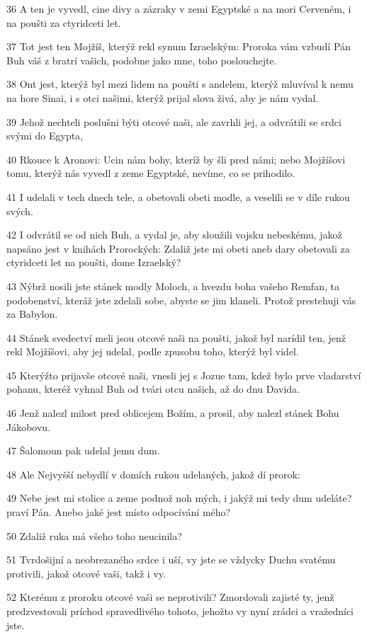 \par 36 A ten je vyvedl, cine divy a zázraky v zemi Egyptské a na mori Cerveném, i na poušti za ctyridceti let.
\par 37 Tot jest ten Mojžíš, kterýž rekl synum Izraelským: Proroka vám vzbudí Pán Buh váš z bratrí vašich, podobne jako mne, toho poslouchejte.
\par 38 Ont jest, kterýž byl mezi lidem na poušti s andelem, kterýž mluvíval k nemu na hore Sinai, i s otci našimi, kterýž prijal slova živá, aby je nám vydal.
\par 39 Jehož nechteli poslušni býti otcové naši, ale zavrhli jej, a odvrátili se srdci svými do Egypta,
\par 40 Rkouce k Aronovi: Ucin nám bohy, kteríž by šli pred námi; nebo Mojžíšovi tomu, kterýž nás vyvedl z zeme Egyptské, nevíme, co se prihodilo.
\par 41 I udelali v tech dnech tele, a obetovali obeti modle, a veselili se v díle rukou svých.
\par 42 I odvrátil se od nich Buh, a vydal je, aby sloužili vojsku nebeskému, jakož napsáno jest v knihách Prorockých: Zdaliž jste mi obeti aneb dary obetovali za ctyridceti let na poušti, dome Izraelský?
\par 43 Nýbrž nosili jste stánek modly Moloch, a hvezdu boha vašeho Remfan, ta podobenství, kteráž jste zdelali sobe, abyste se jim klaneli. Protož prestehuji vás za Babylon.
\par 44 Stánek svedectví meli jsou otcové naši na poušti, jakož byl narídil ten, jenž rekl Mojžíšovi, aby jej udelal, podle zpusobu toho, kterýž byl videl.
\par 45 Kterýžto prijavše otcové naši, vnesli jej s Jozue tam, kdež bylo prve vladarství pohanu, kteréž vyhnal Buh od tvári otcu našich, až do dnu Davida.
\par 46 Jenž nalezl milost pred oblicejem Božím, a prosil, aby nalezl stánek Bohu Jákobovu.
\par 47 Šalomoun pak udelal jemu dum.
\par 48 Ale Nejvyšší nebydlí v domích rukou udelaných, jakož dí prorok:
\par 49 Nebe jest mi stolice a zeme podnož noh mých, i jakýž mi tedy dum udeláte? praví Pán. Anebo jaké jest místo odpocívání mého?
\par 50 Zdaliž ruka má všeho toho neucinila?
\par 51 Tvrdošijní a neobrezaného srdce i uší, vy jste se vždycky Duchu svatému protivili, jakož otcové vaši, takž i vy.
\par 52 Kterému z proroku otcové vaši se neprotivili? Zmordovali zajisté ty, jenž predzvestovali príchod spravedlivého tohoto, jehožto vy nyní zrádci a vražedníci jste.
